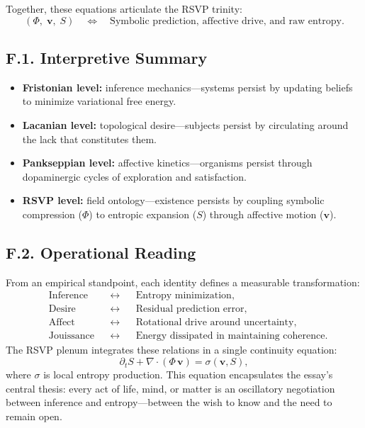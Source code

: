 \documentclass[12pt,a4paper]{article}
\begin{document}
\noindent
Together, these equations articulate the RSVP trinity:
\[
(\Phi,\;\mathbf{v},\;S)
\quad\Longleftrightarrow\quad
\text{Symbolic prediction, affective drive, and raw entropy.}
\]

\subsection*{F.1. Interpretive Summary}

\begin{itemize}[leftmargin=1.2em]
\item \textbf{Fristonian level:} inference mechanics—systems persist by updating beliefs to minimize variational free energy.  
\item \textbf{Lacanian level:} topological desire—subjects persist by circulating around the lack that constitutes them.  
\item \textbf{Pankseppian level:} affective kinetics—organisms persist through dopaminergic cycles of exploration and satisfaction.  
\item \textbf{RSVP level:} field ontology—existence persists by coupling symbolic compression ($\Phi$) to entropic expansion ($S$) through affective motion ($\mathbf{v}$).  
\end{itemize}

\subsection*{F.2. Operational Reading}

From an empirical standpoint, each identity defines a measurable transformation:
\[
\begin{aligned}
&\text{Inference} &&\leftrightarrow&& \text{Entropy minimization},\\
&\text{Desire} &&\leftrightarrow&& \text{Residual prediction error},\\
&\text{Affect} &&\leftrightarrow&& \text{Rotational drive around uncertainty},\\
&\text{Jouissance} &&\leftrightarrow&& \text{Energy dissipated in maintaining coherence}.
\end{aligned}
\]
The RSVP plenum integrates these relations in a single continuity equation:
\[
\partial_t S + \nabla\!\cdot(\Phi\,\mathbf{v}) = \sigma(\mathbf{v},S),
\]
where $\sigma$ is local entropy production.  
This equation encapsulates the essay’s central thesis: every act of life, mind, or matter is an oscillatory negotiation between inference and entropy—between the wish to know and the need to remain open.
\end{document}
